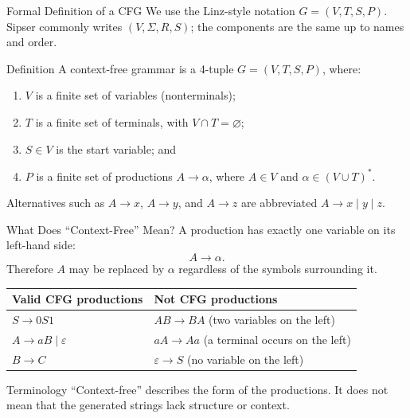 \documentclass[10pt]{beamer}
\begin{document}
\begin{frame}{Formal Definition of a CFG}
  We use the Linz-style notation $G=(V,T,S,P)$. Sipser commonly writes
  $(V,\Sigma,R,S)$; the components are the same up to names and order.
  \pause
  \begin{block}{Definition}
    A context-free grammar is a 4-tuple $G=(V,T,S,P)$, where:
    \begin{enumerate}
      \item $V$ is a finite set of variables (nonterminals);
      \item $T$ is a finite set of terminals, with $V\cap T=\varnothing$;
      \item $S\in V$ is the start variable; and
      \item $P$ is a finite set of productions $A\to\alpha$, where
        $A\in V$ and $\alpha\in(V\cup T)^*$.
    \end{enumerate}
  \end{block}
  Alternatives such as $A\to x$, $A\to y$, and $A\to z$ are abbreviated
  $A\to x\mid y\mid z$.
\end{frame}

\begin{frame}{What Does ``Context-Free'' Mean?}
  A production has exactly one variable on its left-hand side:
  \[
    A\to\alpha.
  \]
  Therefore $A$ may be replaced by $\alpha$ regardless of the symbols surrounding it.
  \pause
  \begin{center}
  \begin{tabular}{L{4.5cm}L{5.3cm}}
    \toprule
    Valid CFG productions & Not CFG productions \\
    \midrule
    $S\to 0S1$ & $AB\to BA$ (two variables on the left) \\
    $A\to aB\mid\varepsilon$ & $aA\to Aa$ (a terminal occurs on the left) \\
    $B\to C$ & $\varepsilon\to S$ (no variable on the left) \\
    \bottomrule
  \end{tabular}
  \end{center}
  \begin{alertblock}{Terminology}
    ``Context-free'' describes the form of the productions. It does not mean that the generated
    strings lack structure or context.
  \end{alertblock}
\end{frame}
\end{document}
